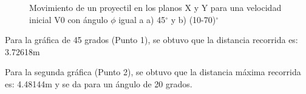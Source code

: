 \documentclass{article}
\begin{document}
\begin{figure}[H]
    \centering
    \caption{Movimiento de un proyectil en los planos X y Y para una velocidad inicial V0 con ángulo $\phi$ igual a a) 45$^{\circ}$ y b) (10-70)$^{\circ}$}
    \label{fig:CondicionesFijasTemp}
\end{figure}

Para la gráfica de 45 grados (Punto 1), se obtuvo que la distancia recorrida es: 3.72618m

Para la segunda gráfica (Punto 2), se obtuvo que la distancia máxima recorrida es: 4.48144m y se da para un ángulo de 20 grados.
\end{document}
